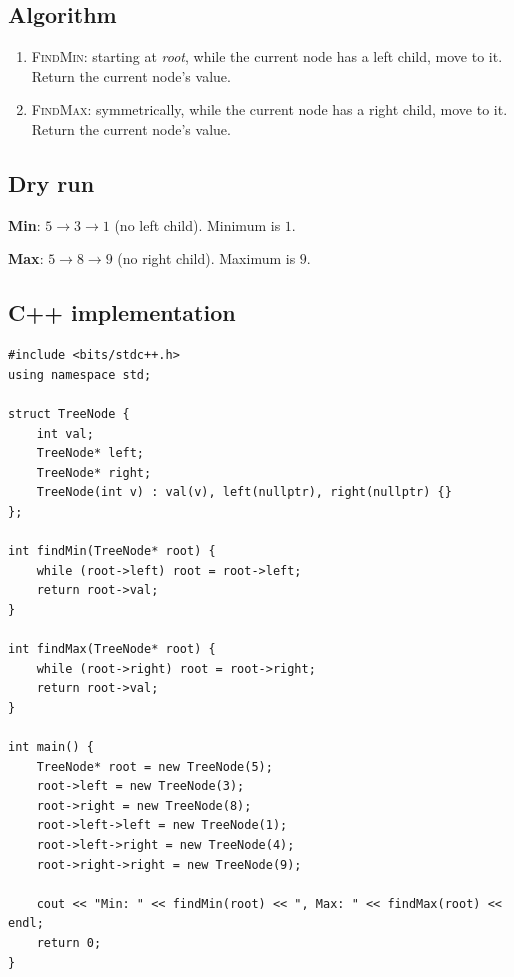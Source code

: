 \subsection*{Algorithm}

\begin{enumerate}
  \item \textsc{FindMin}: starting at \textit{root}, while the current
        node has a left child, move to it. Return the current node's
        value.
  \item \textsc{FindMax}: symmetrically, while the current node has a
        right child, move to it. Return the current node's value.
\end{enumerate}

\subsection*{Dry run}


\textbf{Min}: $5 \to 3 \to 1$ (no left child). Minimum is $1$.

\textbf{Max}: $5 \to 8 \to 9$ (no right child). Maximum is $9$.

\subsection*{C++ implementation}

\begin{lstlisting}
#include <bits/stdc++.h>
using namespace std;

struct TreeNode {
    int val;
    TreeNode* left;
    TreeNode* right;
    TreeNode(int v) : val(v), left(nullptr), right(nullptr) {}
};

int findMin(TreeNode* root) {
    while (root->left) root = root->left;
    return root->val;
}

int findMax(TreeNode* root) {
    while (root->right) root = root->right;
    return root->val;
}

int main() {
    TreeNode* root = new TreeNode(5);
    root->left = new TreeNode(3);
    root->right = new TreeNode(8);
    root->left->left = new TreeNode(1);
    root->left->right = new TreeNode(4);
    root->right->right = new TreeNode(9);

    cout << "Min: " << findMin(root) << ", Max: " << findMax(root) << endl;
    return 0;
}
\end{lstlisting}

